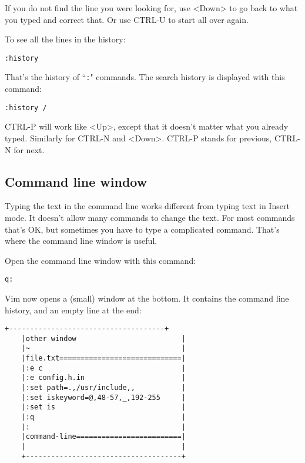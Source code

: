 If you do not find the line you were looking for, use <Down> to go back to what you typed and correct that.
Or use CTRL-U to start all over again.

To see all the lines in the history:

\begin{Verbatim}[samepage=true]
 :history
\end{Verbatim}

That's the history of ``\texttt{:}" commands.
The search history is displayed with this command:

\begin{Verbatim}[samepage=true]
 :history /
\end{Verbatim}

CTRL-P will work like <Up>, except that it doesn't matter what you already typed.
Similarly for CTRL-N and <Down>.
CTRL-P stands for previous, CTRL-N for next.
\subsection{Command line window}
Typing the text in the command line works different from typing text in Insert mode.
It doesn't allow many commands to change the text.
For most commands that's OK, but sometimes you have to type a complicated command.
That's where the command line window is useful.

Open the command line window with this command:

\begin{Verbatim}[samepage=true]
 q:
\end{Verbatim}

Vim now opens a (small) window at the bottom.
It contains the command line history, and an empty line at the end:

\begin{Verbatim}[samepage=true]
    +-------------------------------------+
    |other window                         |
    |~                                    |
    |file.txt=============================|
    |:e c                                 |
    |:e config.h.in                       |
    |:set path=.,/usr/include,,           |
    |:set iskeyword=@,48-57,_,192-255     |
    |:set is                              |
    |:q                                   |
    |:                                    |
    |command-line=========================|
    |                                     |
    +-------------------------------------+
\end{Verbatim}

